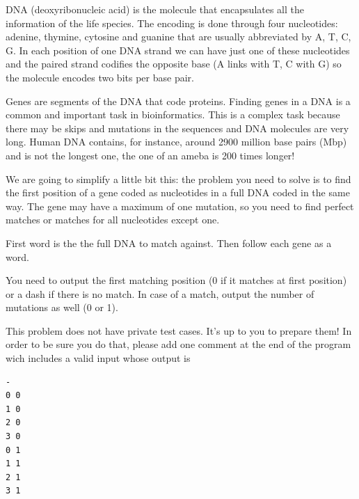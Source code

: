 
\Statement

DNA (deoxyribonucleic acid) is the molecule that encapsulates all the information of the life species.
The encoding is done through four nucleotides: adenine, thymine, cytosine and guanine that are
usually abbreviated by A, T, C, G. In each position of one DNA strand we can have just one of these
nucleotides and the paired strand codifies the opposite base (A links with T, C with G) so the molecule
encodes two bits per base pair.

\medskip

Genes are segments of the DNA that code proteins. Finding genes in a DNA is a common and important
task in bioinformatics. This is a complex task because there may be skips and mutations in the
sequences and DNA molecules are very long. Human DNA contains, for instance, around 2900 million
base pairs (Mbp) and is not the longest one, the one of an ameba is 200 times longer!

\medskip

We are going to simplify a little bit this: the problem you need to solve is to find the first position of a
gene coded as nucleotides in a full DNA coded in the same way. The gene may have a maximum of one
mutation, so you need to find perfect matches or matches for all nucleotides except one.

\Input

First word is the the full DNA to match
against. Then follow each gene as a word.

\Output

You need to output the first matching position (0 if it matches at first position) or
a dash if
there is no match. In case of a match, output the number of mutations as well (0 or 1).

\Observation

This problem does not have private test cases. It's up to you to prepare them!
In order to be sure you do that, please add one comment at the end of the
program wich includes a valid input whose output is

\begin{verbatim}
-
0 0
1 0
2 0
3 0
0 1
1 1
2 1
3 1
\end{verbatim}

\clearpage

\Sample

